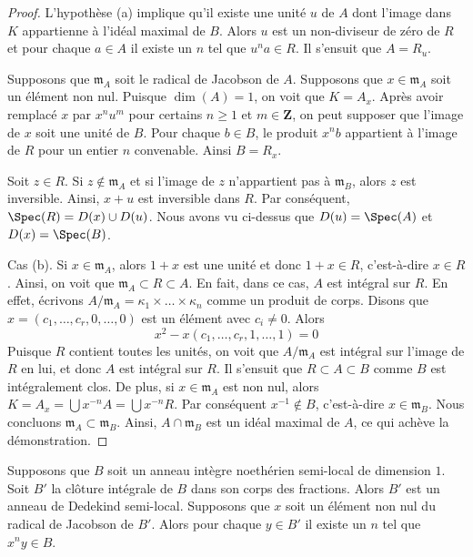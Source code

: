 \begin{proof}
L'hypothèse (a) implique qu'il existe une unité $u$ de $A$ dont
l'image dans $K$ appartienne à l'idéal maximal de $B$. Alors $u$
est un non-diviseur de zéro de $R$ et pour chaque $a \in A$ il
existe un $n$ tel que $u^n a \in R$. Il s'ensuit que $A = R_u$.

\medskip\noindent
Supposons que $\mathfrak m_A$ soit le radical de Jacobson de $A$.
Supposons que $x \in \mathfrak m_A$ soit un élément non nul. Puisque
$\dim(A) = 1$, on voit que $K = A_x$. Après avoir remplacé $x$ par $x^n
u^m$ pour certains $n \geq 1$ et $m \in \mathbf{Z}$, on peut supposer que
l'image de $x$ soit une unité de $B$. Pour chaque $b \in B$, le produit $x^nb$
appartient à l'image de $R$ pour un entier $n$ convenable. Ainsi $B = R_x$.

\medskip\noindent
Soit $z \in R$. Si $z \not \in \mathfrak m_A$ et si l'image de $z$ n'appartient pas
à $\mathfrak m_B$, alors $z$ est inversible. Ainsi, $x
+ u$ est inversible dans $R$. Par conséquent, $\Spec(R) = D(x) \cup
D(u)$. Nous avons vu ci-dessus que $D(u) = \Spec(A)$ et $D(x) = \Spec(B)$.

\medskip\noindent
Cas (b). Si $x \in \mathfrak m_A$, alors $1 + x$ est une
unité et donc $1 + x \in R$, c'est-à-dire $x \in R$. Ainsi,
on voit que $\mathfrak m_A \subset R \subset A$. En
fait, dans ce cas, $A$ est intégral sur $R$. En effet,
écrivons $A/\mathfrak m_A = \kappa_1 \times \ldots \times
\kappa_n$ comme un produit de corps. Disons que $x = (c_1,
\ldots, c_r, 0, \ldots, 0)$ est un élément avec $c_i \not = 0$. Alors
$$
x^2 - x(c_1, \ldots, c_r, 1, \ldots, 1)  = 0
$$
Puisque $R$ contient toutes les unités, on voit que
$A/\mathfrak m_A$ est intégral sur l'image de $R$ en lui,
et donc $A$ est intégral sur $R$. Il s'ensuit que $R \subset
A \subset B$ comme $B$ est intégralement clos. De plus, si
$x \in \mathfrak m_A$ est non nul, alors $K = A_x = \bigcup
x^{-n}A = \bigcup x^{-n}R$. Par conséquent $x^{-1} \not \in
B$, c'est-à-dire $x \in \mathfrak m_B$. Nous concluons
$\mathfrak m_A \subset \mathfrak m_B$. Ainsi, $A \cap
\mathfrak m_B$ est un idéal maximal de $A$, ce qui achève la démonstration.
\end{proof}

\begin{lemma}
\label{lemma-semi-local-dimension-one-conductor}
Supposons que $B$ soit un anneau intègre noethérien semi-local de
dimension $1$. Soit $B'$ la clôture
intégrale de $B$ dans son corps des fractions. Alors $B'$
est un anneau de Dedekind semi-local. Supposons que $x$
soit un élément non nul du radical de Jacobson de $B'$. Alors
pour chaque $y \in B'$ il existe un $n$ tel que $x^n y \in B$.
\end{lemma}

